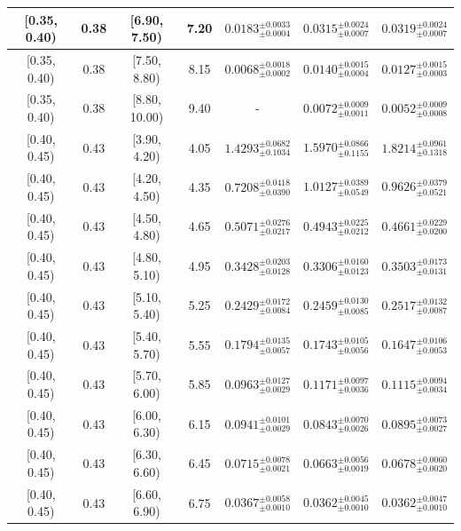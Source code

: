 \begin{longtable}{|c|c|c|c|c|c|c|}
[0.35, 0.40) & 0.38 & [6.90, 7.50) & 7.20 & $0.0183^{ \pm 0.0033 }_{ \pm 0.0004 }$ & $0.0315^{ \pm 0.0024 }_{ \pm 0.0007 }$ & $0.0319^{ \pm 0.0024 }_{ \pm 0.0007 }$ \\ 
\hline
[0.35, 0.40) & 0.38 & [7.50, 8.80) & 8.15 & $0.0068^{ \pm 0.0018 }_{ \pm 0.0002 }$ & $0.0140^{ \pm 0.0015 }_{ \pm 0.0004 }$ & $0.0127^{ \pm 0.0015 }_{ \pm 0.0003 }$ \\ 
\hline
[0.35, 0.40) & 0.38 & [8.80, 10.00) & 9.40 & - & $0.0072^{ \pm 0.0009 }_{ \pm 0.0011 }$ & $0.0052^{ \pm 0.0009 }_{ \pm 0.0008 }$ \\ 
\hline
[0.40, 0.45) & 0.43 & [3.90, 4.20) & 4.05 & $1.4293^{ \pm 0.0682 }_{ \pm 0.1034 }$ & $1.5970^{ \pm 0.0866 }_{ \pm 0.1155 }$ & $1.8214^{ \pm 0.0961 }_{ \pm 0.1318 }$ \\ 
\hline
[0.40, 0.45) & 0.43 & [4.20, 4.50) & 4.35 & $0.7208^{ \pm 0.0418 }_{ \pm 0.0390 }$ & $1.0127^{ \pm 0.0389 }_{ \pm 0.0549 }$ & $0.9626^{ \pm 0.0379 }_{ \pm 0.0521 }$ \\ 
\hline
[0.40, 0.45) & 0.43 & [4.50, 4.80) & 4.65 & $0.5071^{ \pm 0.0276 }_{ \pm 0.0217 }$ & $0.4943^{ \pm 0.0225 }_{ \pm 0.0212 }$ & $0.4661^{ \pm 0.0229 }_{ \pm 0.0200 }$ \\ 
\hline
[0.40, 0.45) & 0.43 & [4.80, 5.10) & 4.95 & $0.3428^{ \pm 0.0203 }_{ \pm 0.0128 }$ & $0.3306^{ \pm 0.0160 }_{ \pm 0.0123 }$ & $0.3503^{ \pm 0.0173 }_{ \pm 0.0131 }$ \\ 
\hline
[0.40, 0.45) & 0.43 & [5.10, 5.40) & 5.25 & $0.2429^{ \pm 0.0172 }_{ \pm 0.0084 }$ & $0.2459^{ \pm 0.0130 }_{ \pm 0.0085 }$ & $0.2517^{ \pm 0.0132 }_{ \pm 0.0087 }$ \\ 
\hline
[0.40, 0.45) & 0.43 & [5.40, 5.70) & 5.55 & $0.1794^{ \pm 0.0135 }_{ \pm 0.0057 }$ & $0.1743^{ \pm 0.0105 }_{ \pm 0.0056 }$ & $0.1647^{ \pm 0.0106 }_{ \pm 0.0053 }$ \\ 
\hline
[0.40, 0.45) & 0.43 & [5.70, 6.00) & 5.85 & $0.0963^{ \pm 0.0127 }_{ \pm 0.0029 }$ & $0.1171^{ \pm 0.0097 }_{ \pm 0.0036 }$ & $0.1115^{ \pm 0.0094 }_{ \pm 0.0034 }$ \\ 
\hline
[0.40, 0.45) & 0.43 & [6.00, 6.30) & 6.15 & $0.0941^{ \pm 0.0101 }_{ \pm 0.0029 }$ & $0.0843^{ \pm 0.0070 }_{ \pm 0.0026 }$ & $0.0895^{ \pm 0.0073 }_{ \pm 0.0027 }$ \\ 
\hline
[0.40, 0.45) & 0.43 & [6.30, 6.60) & 6.45 & $0.0715^{ \pm 0.0078 }_{ \pm 0.0021 }$ & $0.0663^{ \pm 0.0056 }_{ \pm 0.0019 }$ & $0.0678^{ \pm 0.0060 }_{ \pm 0.0020 }$ \\ 
\hline
[0.40, 0.45) & 0.43 & [6.60, 6.90) & 6.75 & $0.0367^{ \pm 0.0058 }_{ \pm 0.0010 }$ & $0.0362^{ \pm 0.0045 }_{ \pm 0.0010 }$ & $0.0362^{ \pm 0.0047 }_{ \pm 0.0010 }$ \\ 

\end{longtable}
